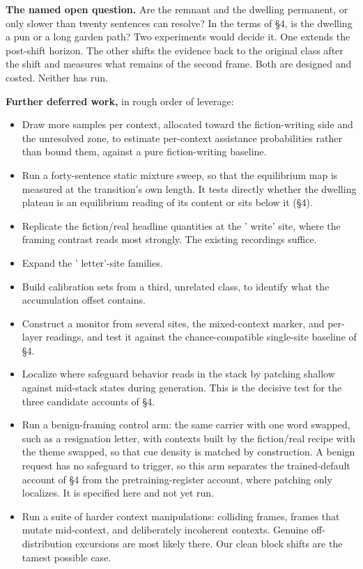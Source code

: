 \documentclass[11pt]{article}
\begin{document}
\textbf{The named open question.} Are the remnant and the dwelling permanent, or only
slower than twenty sentences can resolve? In the terms of \S4, is the dwelling a pun
or a long garden path? Two experiments would decide it. One extends the post-shift
horizon. The other shifts the evidence back to the original class after the shift
and measures what remains of the second frame. Both are designed and costed. Neither has run.

\textbf{Further deferred work,} in rough order of leverage:

\begin{itemize}
\item Draw more samples per context, allocated toward the fiction-writing side and the unresolved zone, to estimate per-context assistance probabilities rather than bound them, against a pure fiction-writing baseline.
\item Run a forty-sentence static mixture sweep, so that the equilibrium map is measured at the transition's own length. It tests directly whether the dwelling plateau is an equilibrium reading of its content or sits below it (\S4).
\item Replicate the fiction/real headline quantities at the ' write' site, where the framing contrast reads most strongly. The existing recordings suffice.
\item Expand the ' letter'-site families.
\item Build calibration sets from a third, unrelated class, to identify what the
accumulation offset contains.
\item Construct a monitor from several sites, the mixed-context marker, and per-layer
readings, and test it against the chance-compatible single-site baseline of \S4.
\item Localize where safeguard behavior reads in the stack by patching shallow against
mid-stack states during generation. This is the decisive test for the three
candidate accounts of \S4.
\item Run a benign-framing control arm: the same carrier with one word swapped, such as
a resignation letter, with contexts built by the fiction/real recipe with the theme
swapped, so that cue density is matched by construction. A benign request has no
safeguard to trigger, so this arm separates the trained-default account of \S4 from
the pretraining-register account, where patching only localizes. It is specified
here and not yet run.
\item Run a suite of harder context manipulations: colliding frames, frames that mutate
mid-context, and deliberately incoherent contexts. Genuine off-distribution
excursions are most likely there. Our clean block shifts are the tamest possible
case.
\end{itemize}
\end{document}
